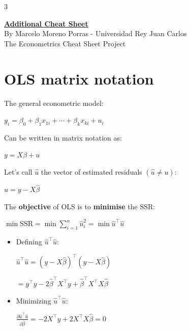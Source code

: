 \documentclass[10pt, a4paper, landscape]{article}
\newcommand{\SSR}{\text{SSR}}
\begin{document}
\begin{multicols}{3}

\begin{center}
	\textbf{\LARGE \href{https://github.com/marcelomijas/econometrics-cheatsheet}{Additional Cheat Sheet}} \\
	{\footnotesize By Marcelo Moreno Porras - Universidad Rey Juan Carlos} \\
	{\footnotesize The Econometrics Cheat Sheet Project}
\end{center}

\section*{OLS matrix notation}

The general econometric model:

\begin{center}
	\( y_{i} = \beta_{0} + \beta_{1} x_{1i} + \cdots + \beta_{k} x_{ki} + u_{i} \)
\end{center}

Can be written in matrix notation as:

\begin{center}
	\( y = X \beta + u \)
\end{center}

Let's call \( \hat{u} \) the vector of estimated residuals \( (\hat{u} \neq u) \):

\begin{center}
	\( \hat{u} = y - X \hat{\beta} \)
\end{center}

The \textbf{objective} of OLS is to \textbf{minimise} the \( \SSR \):

\begin{center}
	\( \min \SSR = \min \sum_{i = 1}^{n} \hat{u}_{i}^{2} = \min \hat{u}^{\top} \hat{u} \)
\end{center}

\begin{itemize}[leftmargin=*]
	\item Defining \( \hat{u}^{\top} \hat{u} \):
	\begin{center}
		\( \hat{u}^{\top} \hat{u} = (y - X \hat{\beta})^{\top} (y - X \hat{\beta}) \)

		\( = y^{\top} y - 2 \hat{\beta}^{\top} X^{\top} y + \hat{\beta}^{\top} X^{\top} X \hat{\beta} \)
	\end{center}
	\item Minimizing \( \hat{u}^{\top} \hat{u} \):
	\begin{center}
		\( \frac{\partial \hat{u}^{\top} \hat{u}}{\partial \hat{\beta}} = -2 X^{\top} y + 2 X^{\top} X \hat{\beta} = 0 \)


\end{center}
\end{itemize}
\end{multicols}
\end{document}
